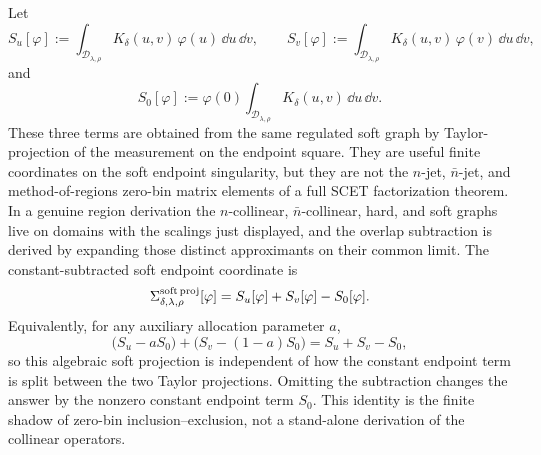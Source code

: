 Let
\[
  S_u[\varphi]
  :=
  \int_{\mathcal D_{\lambda,\rho}}
  K_\delta(u,v)\,\varphi(u)\,\dd u\,\dd v,
  \qquad
  S_v[\varphi]
  :=
  \int_{\mathcal D_{\lambda,\rho}}
  K_\delta(u,v)\,\varphi(v)\,\dd u\,\dd v,
\]
and
\[
  S_0[\varphi]
  :=
  \varphi(0)
  \int_{\mathcal D_{\lambda,\rho}}K_\delta(u,v)\,\dd u\,\dd v .
\]
These three terms are obtained from the same regulated soft graph by
Taylor-projection of the measurement on the endpoint square.  They are useful
finite coordinates on the soft endpoint singularity, but they are not the
\(n\)-jet, \(\bar n\)-jet, and method-of-regions zero-bin matrix elements of a
full SCET factorization theorem.  In a genuine region derivation the
\(n\)-collinear, \(\bar n\)-collinear, hard, and soft graphs live on domains
with the scalings just displayed, and the overlap subtraction is derived by
expanding those distinct approximants on their common limit.  The
constant-subtracted soft endpoint coordinate is
\begin{equation}
  \Sigma_{\delta,\lambda,\rho}^{\rm soft\,proj}[\varphi]
  =
  S_u[\varphi]+S_v[\varphi]-S_0[\varphi].
  \label{eq:regulated-scet-one-emission-subtracted}
\end{equation}
Equivalently, for any auxiliary allocation parameter \(a\),
\[
  \bigl(S_u-aS_0\bigr)
  +
  \bigl(S_v-(1-a)S_0\bigr)
  =
  S_u+S_v-S_0,
\]
so this algebraic soft projection is independent of how the constant endpoint
term is split between the two Taylor projections.  Omitting the subtraction
changes the answer by the nonzero constant endpoint term \(S_0\).  This
identity is the finite shadow of zero-bin inclusion--exclusion, not a
stand-alone derivation of the collinear operators.


